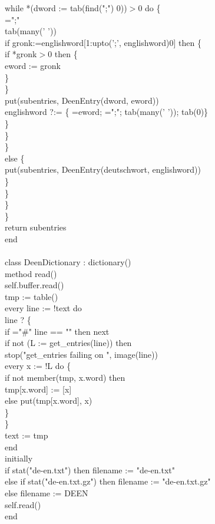 {\>\>\>\>\>\>while *(dword := tab(find(";") {\textbar} 0))$>$0 do \{ \\
\>\>\>\>\>\>\>=";" \\
\>\>\>\>\>\>\>tab(many(' ')) \\
\>\>\>\>\>\>\>if gronk:=englishword[1:upto(';{\textbar}', englishword){\textbar}0] then \{ \\
\>\>\>\>\>\>\>\>if *gronk$>$0 then \{ \\
\>\>\>\>\>\>\>\>\>eword := gronk \\
\>\>\>\>\>\>\>\>\>\} \\
\>\>\>\>\>\>\>\>\} \\
\>\>\>\>\>\>\>put(subentries, DeenEntry(dword, eword)) \\
\>\>\>\>\>\>\>englishword ?:= \{ =eword; =";"; tab(many(' ')); tab(0)\} \\
\>\>\>\>\>\>\>\} \\
\>\>\>\>\>\>\} \\
\>\>\>\>\>\} \\
\>\>\>\>else \{ \\
\>\>\>\>\>put(subentries, DeenEntry(deutschwort, englishword)) \\
\>\>\>\>\>\} \\
\>\>\>\>\} \\
\>\>\>\} \\
\>\>\} \\
\>return subentries \\
end \\
\ \\
class DeenDictionary : dictionary() \\
\>method read() \\
\>\>self.buffer.read() \\
\>\>tmp := table() \\
\>\>every line := !text do \\
\>\>\>line ? \{ \\
\>\>\>\>if ="\#" {\textbar} line == "" then next \\
\>\>\>\>if not (L := get\_entries(line)) then \\
\>\>\>\>\>stop("get\_entries failing on ", image(line)) \\
\>\>\>\>every x := !L do \{ \\
\>\>\>\>\>if not member(tmp, x.word) then \\
\>\>\>\>\>\>tmp[x.word] := [x] \\
\>\>\>\>\>else put(tmp[x.word], x) \\
\>\>\>\>\>\} \\
\>\>\>\>\} \\
\>\>text := tmp \\
\>end \\
initially \\
\>if stat("de-en.txt") then filename := "de-en.txt" \\
\>else if stat("de-en.txt.gz") then filename := "de-en.txt.gz" \\
\>else filename := DEEN \\
\>self.read() \\
end
}



